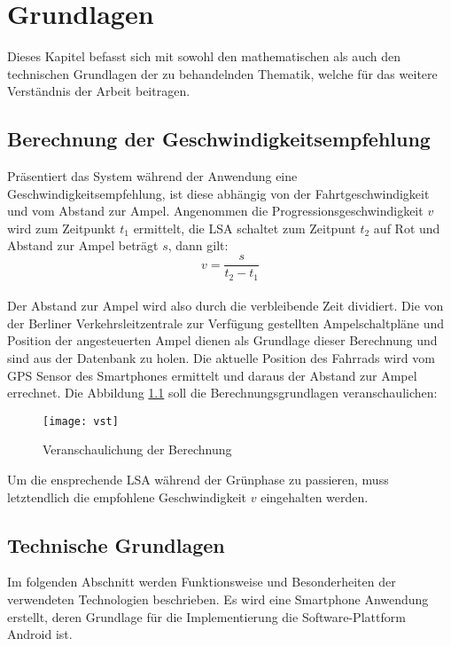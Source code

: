 \chapter{\label{chap:grundlagen}Grundlagen}
Dieses Kapitel befasst sich mit sowohl den mathematischen als auch den technischen Grundlagen der zu behandelnden Thematik, welche für das weitere Verständnis der Arbeit beitragen.
\section{\label{sec:mathGrundlagen}Berechnung der Geschwindigkeitsempfehlung}
Präsentiert das System während der Anwendung eine Geschwindigkeitsempfehlung, ist diese abhängig von der Fahrtgeschwindigkeit und vom Abstand zur Ampel. Angenommen die Progressionsgeschwindigkeit $v$ wird zum Zeitpunkt $t_{1}$ ermittelt, die \gls {LSA} schaltet zum Zeitpunt $t_{2}$ auf Rot und Abstand zur Ampel beträgt $s$, dann gilt: \\
\[ v = \frac{s}{t_{2} - t_{1}} \] \\
Der Abstand zur Ampel wird also durch die verbleibende Zeit dividiert. 
Die von der Berliner Verkehrsleitzentrale zur Verfügung gestellten Ampelschaltpläne und Position der angesteuerten Ampel dienen als Grundlage dieser Berechnung und sind aus der Datenbank zu holen. Die aktuelle Position des Fahrrads wird vom \gls{GPS} Sensor des \glspl{Smartphone} ermittelt und daraus der Abstand zur Ampel errechnet. Die Abbildung \ref{fig:vst} soll die Berechnungsgrundlagen veranschaulichen: 
\begin{figure}[H]  
    \centering  
    \texttt{[image: vst]}     
    \caption[Berechnung Progressionsgeschwindigkeit]{Veranschaulichung der Berechnung}
    \label{fig:vst}
\end{figure}
Um die ensprechende \gls{LSA} während der Grünphase zu passieren, muss letztendlich die empfohlene Geschwindigkeit $v$ eingehalten werden.
\section{\label{sec:technGrundlagen}Technische Grundlagen}
Im folgenden Abschnitt werden Funktionsweise und Besonderheiten der verwendeten Technologien beschrieben. Es wird eine Smartphone Anwendung erstellt, deren Grundlage für die Implementierung die Software-Plattform Android ist.
